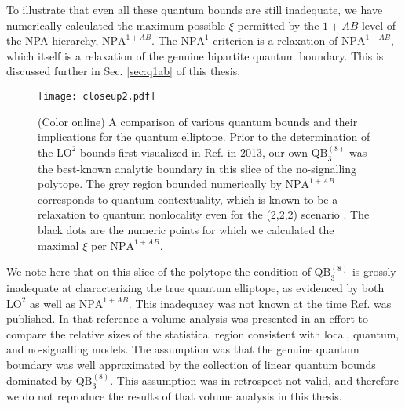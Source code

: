 \documentclass[
  12pt          %
  ,letterpaper  %
  ,center       %
  ,noupper      %
  ,english,fleqn]{uconnthesis}
\begin{document}
To illustrate that even all these quantum bounds are still inadequate, we have numerically calculated the maximum possible $\xi$ permitted by the $1+AB$ level of the NPA hierarchy, $\mbox{NPA}^{1+AB}$. The $\mbox{NPA}^{1}$ criterion is a relaxation of $\mbox{NPA}^{1+AB}$, which itself is a relaxation of the genuine bipartite quantum boundary. This is discussed further in Sec. \ref{sec:q1ab} of this thesis.
\begin{figure}[ht]
\centering
\begin{minipage}[t]{1\textwidth}
    \texttt{[image: closeup2.pdf]}
    \caption{(Color online) A comparison of various quantum bounds and their implications for the quantum \gls{elliptope}. Prior to the determination of the $\mbox{LO}^2$ bounds first visualized in Ref. \cite{LONatureComm} in 2013, our own $\mbox{QB}_3^{(8)}$ was the best-known analytic boundary in this slice of the no-signalling \gls{polytope}. The grey region bounded numerically by $\mbox{NPA}^{1+AB}$ corresponds to quantum contextuality, which is known to be a relaxation to quantum nonlocality even for the (2,2,2) scenario \cite{AlmostQuantum2}. The black dots are the numeric points for which we calculated the maximal $\xi$ per $\mbox{NPA}^{1+AB}$.}\label{fig:boundcomptight}
\end{minipage}
\end{figure}

We note here that on this slice of the polytope the condition of $\mbox{QB}_3^{(8)}$ is grossly inadequate at characterizing the true quantum elliptope, as evidenced by both $\mbox{LO}^2$ as well as $\mbox{NPA}^{1+AB}$. This inadequacy was not known at the time Ref. \cite{WolfeQB} was published. In that reference a volume analysis was presented in an effort to compare the relative sizes of the statistical region consistent with local, quantum, and no-signalling models. The assumption was that the genuine quantum boundary was well approximated by the collection of linear quantum bounds dominated by $\mbox{QB}_3^{(8)}$. This assumption was in retrospect not valid, and therefore we do not reproduce the results of that volume analysis in this thesis. 
\end{document}
